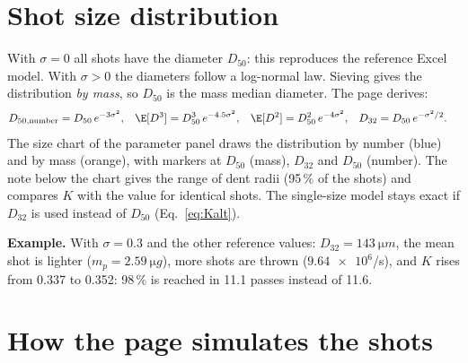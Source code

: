 \documentclass[11pt,a4paper]{article}
\begin{document}
\section{Shot size distribution}\label{sec:sizes}

With $\sigma=0$ all shots have the diameter $D_{50}$: this reproduces the reference Excel model. With $\sigma>0$ the diameters follow a log-normal law. Sieving gives the distribution \emph{by mass}, so $D_{50}$ is the mass median diameter. The page derives:
\begin{align}
D_{50,\text{number}}&=D_{50}\,e^{-3\sigma^2}, &
\E[D^3]&=D_{50}^3\,e^{-4.5\sigma^2}, &
\E[D^2]&=D_{50}^2\,e^{-4\sigma^2}, &
D_{32}&=D_{50}\,e^{-\sigma^2/2}.
\end{align}
The size chart of the parameter panel draws the distribution by number (blue) and by mass (orange), with markers at $D_{50}$ (mass), $D_{32}$ and $D_{50}$ (number). The note below the chart gives the range of dent radii (95\,\% of the shots) and compares $K$ with the value for identical shots. The single-size model stays exact if $D_{32}$ is used instead of $D_{50}$ (Eq.~\ref{eq:Kalt}).

\begin{keybox}
\textbf{Example.} With $\sigma=0.3$ and the other reference values: $D_{32}=\SI{143}{\micro m}$, the mean shot is lighter ($m_p=\SI{2.59}{\micro g}$), more shots are thrown ($\num{9.64e6}$/s), and $K$ rises from 0.337 to 0.352: 98\,\% is reached in 11.1 passes instead of 11.6.
\end{keybox}

\section{How the page simulates the shots}\label{sec:sim}
\end{document}
